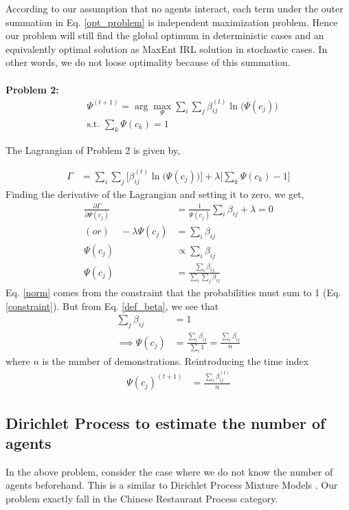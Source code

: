 \documentclass{article}[11pt]
\begin{document}
According to our assumption that no agents interact, each term under the outer summation in Eq. \ref{opt_problem} is independent maximization problem. Hence our problem will still find the global optimum in deterministic cases and an equivalently optimal solution as MaxEnt IRL solution in stochastic cases. In other words, we do not loose optimality because of this summation.  \\ \\ 
\textbf{Problem 2: }
\begin{align}
&\Psi^{(t+1)} = \arg \max_{\Psi} \sum_i \sum_j \beta_{ij}^{(t)} \ln\big(\Psi(c_{j})\big)\\
\label{constraint}
&\text{s.t. } \sum_k \Psi(c_{k}) = 1
\end{align}

The Lagrangian of Problem 2 is given by,

\begin{align*}
\Gamma &= \sum_i \sum_j \Big[\beta_{ij}^{(t)} \ln\big(\Psi(c_{j})\big)\Big] + \lambda\Big[\sum_k \Psi(c_{k}) - 1\Big]
\end{align*} 
Finding the derivative of the Lagrangian and setting it to zero, we get, 
\begin{align}
\frac{\partial\Gamma}{\partial\Psi(c_{j})} &= \frac{1}{\Psi(c_{j})}\sum_i \beta_{ij} + \lambda = 0\\
(or) \ \ \ \ \ -\lambda  \Psi(c_{j}) &= \sum_i \beta_{ij}\\
\Psi(c_{j}) &\propto \sum_i \beta_{ij}\\
\label{norm}
\Psi(c_{j}) &= \frac{\sum_i \beta_{ij}}{\sum_i \sum_j\beta_{ij}}
\end{align} 
Eq. \ref{norm} comes from the constraint that the probabilities must sum to 1 (Eq. \ref{constraint}). But from Eq. \ref{def_beta}, we see that
\begin{align*}
\sum_j\beta_{ij} &= 1\\
\implies \Psi(c_{j}) &= \frac{\sum_i \beta_{ij}}{\sum_i 1} = \frac{\sum_i \beta_{ij}}{n}
\end{align*} where $n$ is the number of demonstrations. Reintroducing the time index
\begin{align*}
\Psi(c_{j})^{(t+1)} &=  \frac{\sum_i \beta_{ij}^{(t)}}{n}
\end{align*}

\subsection{Dirichlet Process to estimate the number of agents}
In the above problem, consider the case where we do not know the number of agents beforehand. This is a similar to Dirichlet Process Mixture Models \cite{mccullagh2008many}. Our problem exactly fall in the Chinese Restaurant Process category. 
\end{document}

